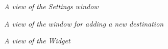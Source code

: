 \begin{figure}
\begin{center}
  \caption{\emph{A view of the Settings window}} \label{pic:Settings}
\end{center}    
\end{figure}


\begin{figure}
\begin{center}
  \caption{\emph{A view of the window for adding a new destination}} \label{AddDestination}
\end{center}    
\end{figure}


\begin{figure}
\begin{center}
  \caption{\emph{A view of the Widget}} \label{pic:widget}
\end{center}    
\end{figure}

